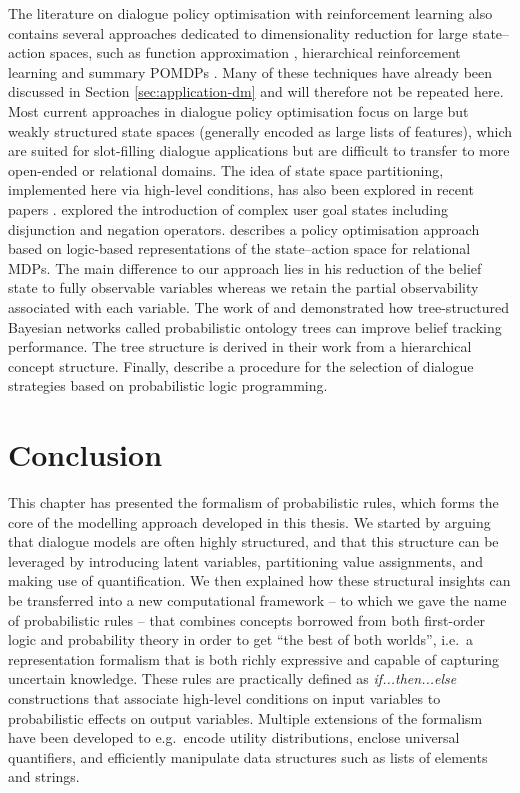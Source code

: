 The literature on dialogue policy optimisation with reinforcement learning also contains several approaches dedicated to dimensionality reduction for large state--action spaces, such as function approximation \citep{Henderson:2008}, hierarchical reinforcement learning \citep{Cuayahuitl:2010} and summary POMDPs \citep{Young:2010}.  Many of these techniques have already been discussed in Section \ref{sec:application-dm} and will therefore not be repeated here. Most current approaches in dialogue policy optimisation focus on large but weakly structured state spaces (generally encoded as large lists of features), which are suited for slot-filling dialogue applications but are difficult to transfer to more open-ended or relational domains.  The idea of state space partitioning, implemented here via high-level conditions, has also been explored in recent papers \citep[see e.g.\ ][]{Williams2010}. \cite{Crook:2010} explored the introduction of complex user goal states including disjunction and negation operators. \cite{Heriberto2011} describes a policy optimisation approach based on logic-based representations of the state--action space for relational MDPs. The main difference to our approach lies in his reduction of the belief state to fully observable variables whereas we retain the partial observability associated with each variable.  The work of \cite{Mehta:2010} and \cite{Raux2011} demonstrated how tree-structured Bayesian networks called probabilistic ontology trees can improve belief tracking performance.  The tree structure is derived in their work from a hierarchical concept structure.  Finally, \cite{neill2011} describe a procedure for the selection of dialogue strategies based on probabilistic logic programming. 

\section{Conclusion}

This chapter has presented the formalism of probabilistic rules, which forms the core of the modelling approach developed in this thesis. We started by arguing that dialogue models are often highly structured, and that this structure can be leveraged by introducing latent variables, partitioning value assignments, and making use of quantification. We then explained how these structural insights can be transferred into a new computational framework -- to which we gave the name of probabilistic rules -- that combines concepts borrowed from both first-order logic and probability theory in order to get ``the best of both worlds'', i.e.\ a representation formalism that is both richly expressive and capable of capturing uncertain knowledge.  These rules are practically defined as \textit{if...then...else} constructions that associate high-level conditions on input variables to probabilistic effects on output variables.  Multiple extensions of the formalism have been developed to e.g.\ encode utility distributions, enclose universal quantifiers, and efficiently manipulate data structures such as lists of elements and strings.

